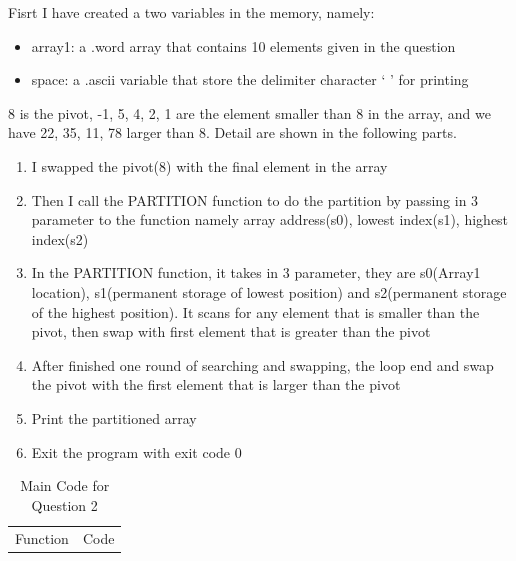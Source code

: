 \documentclass[10pt,a4paper]{article}
\begin{document}
\begin{ans}

    \noindent Fisrt I have created a two variables in the memory, namely: 

	\begin{itemize}
		\item array1: a .word array that contains 10 elements given in the question
		\item space: a .ascii variable that store the delimiter character ` ' for printing
	\end{itemize}
	8 is the pivot, -1, 5, 4, 2, 1 are the element smaller than 8 in the array, and we have 22,
	35, 11, 78 larger than 8. Detail are shown in the following parts. 
	\begin{enumerate}
		\item I swapped the pivot(8) with the final element in the array
		\item Then I call the PARTITION function to do the partition by passing in 3 parameter to the function
		 	namely array address(s0), lowest index(s1), highest index(s2)
		\item In the PARTITION function, it takes in 3 parameter, they are s0(Array1 location), s1(permanent storage of lowest position) and s2(permanent storage of the highest position). It scans for any element that is smaller than the pivot, then swap with first element that is greater than the pivot
		\item After finished one round of searching and swapping, the loop end and swap the pivot with the first element that is larger than the pivot
		\item Print the partitioned array
		\item Exit the program with exit code 0
	\end{enumerate}
	
    \begin{table}[htbp]
        \begin{center}
			\caption{Main Code for Question 2}
				\begin{tabular}[H]{|M{3cm}|M{12cm}|}
					\hline
					Function & Code\\


\end{tabular}
\end{center}
\end{table}
\end{ans}
\end{document}
